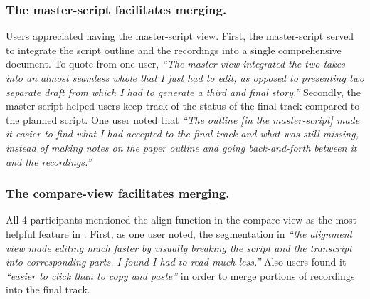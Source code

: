 %

\subsubsection{The master-script facilitates merging.} 
Users appreciated having the master-script view. First, the master-script served to integrate the script outline and the recordings into a single comprehensive document. To quote from one user, \textit{``The master view integrated the two takes into an almost seamless whole that I just had to edit, as opposed to presenting two separate draft from which I had to generate a third and final story.''}  Secondly, the master-script helped users keep track of the status of the final track compared to the planned script. One user noted that \textit{``The outline [in the master-script] made it easier to find what I had accepted to the final track and what was still missing, instead of making notes on the paper outline and going back-and-forth between it and the recordings.'' } 

\subsubsection{The compare-view facilitates merging.}  
All 4 participants mentioned the align function in the compare-view as the most helpful feature in \voicescript . First, as one user noted, the segmentation in \textit{``the alignment view made editing much faster by visually breaking the script and the transcript into corresponding parts. I found I had to read much less.''} Also users found it \textit{``easier to click than to copy and paste''} in order to merge portions of recordings into the final track.  


